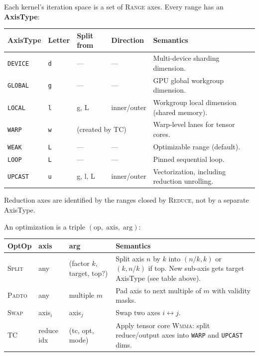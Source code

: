 \documentclass[10pt,letterpaper]{article}
\newcommand{\op}[1]{\textsc{#1}}
\begin{document}
Each kernel's iteration space is a set of \op{Range} axes. Every range has an \textbf{AxisType}:

\medskip
\begin{tabular}{@{}l l l l l@{}}
\toprule
\textbf{AxisType} & \textbf{Letter} & \textbf{Split from} & \textbf{Direction} & \textbf{Semantics} \\
\midrule
{\color{axgreen}\texttt{DEVICE}} & \texttt{d} & --- & --- & Multi-device sharding dimension. \\
{\color{axblue}\texttt{GLOBAL}} & \texttt{g} & --- & --- & GPU global workgroup dimension. \\
{\color{axcyan}\texttt{LOCAL}} & \texttt{l} & g, L & inner/outer & Workgroup local dimension (shared memory). \\
{\color{axbrcyan}\texttt{WARP}} & \texttt{w} & \multicolumn{2}{l}{(created by \op{TC})} & Warp-level lanes for tensor cores. \\
{\color{axwhite}\texttt{WEAK}} & \texttt{L} & --- & --- & Optimizable range (default). \\
{\color{axwhite}\texttt{LOOP}} & \texttt{L} & --- & --- & Pinned sequential loop. \\
{\color{axyellow}\texttt{UPCAST}} & \texttt{u} & g, l, L & inner/outer & Vectorization, including reduction unrolling. \\
\bottomrule
\end{tabular}

\medskip
Reduction axes are identified by the ranges closed by \op{Reduce}, not by a separate AxisType.

\medskip
An optimization is a triple $(\mathrm{op},\;\mathrm{axis},\;\mathrm{arg})$:

\smallskip
\begin{tabular}{@{}l l l p{6.5cm}@{}}
\toprule
\textbf{OptOp} & \textbf{axis} & \textbf{arg} & \textbf{Semantics} \\
\midrule
\op{Split} & any & (factor $k$, target, top?) &
  Split axis $n$ by $k$ into $(n/k, k)$ or $(k, n/k)$ if top. New sub-axis gets target AxisType (see table above). \\
\op{Padto} & any & multiple $m$ &
  Pad axis to next multiple of $m$ with validity masks. \\[4pt]
\op{Swap} & axis$_i$ & axis$_j$ &
  Swap two axes $i \leftrightarrow j$. \\
\op{TC} & reduce idx & (tc, opt, mode) &
  Apply tensor core \op{Wmma}: split reduce/output axes into \texttt{WARP} and \texttt{UPCAST} dims. \\
\bottomrule
\end{tabular}
\end{document}
